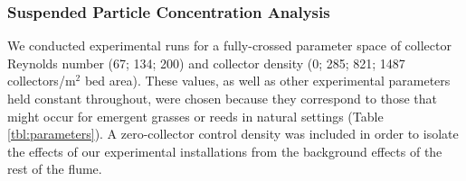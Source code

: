 \documentclass[geosciences,article,submit,moreauthors,pdftex]{Definitions/mdpi}
\begin{document}
\subsubsection{Suspended Particle Concentration Analysis}

We conducted experimental runs for a fully-crossed parameter space of collector Reynolds number (67; 134; 200) and collector density (0; 285; 821; 1487 collectors/m$^2$ bed area). These values, as well as other experimental parameters held constant throughout, were chosen because they correspond to those that might occur for emergent grasses or reeds in natural settings (Table \ref{tbl:parameters}). A zero-collector control density was included in order to isolate the effects of our experimental installations from the background effects of the rest of the flume.   
\end{document}
